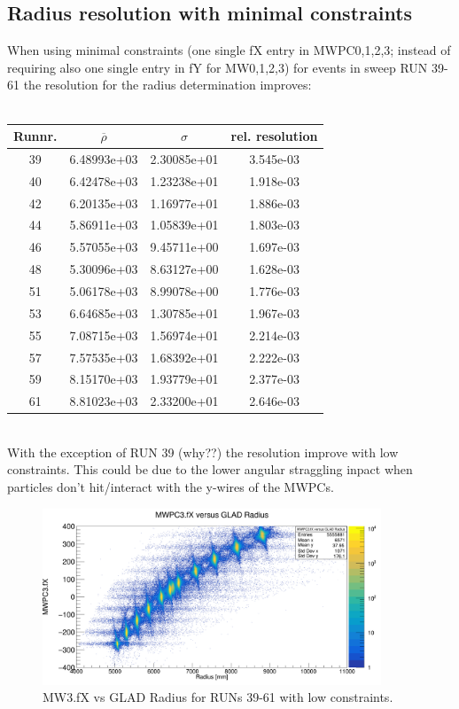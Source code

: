 \documentclass[12pt, letterpaper]{article}
\begin{document}
\begin{appendices}
\section{Radius resolution with minimal constraints}
When using minimal constraints (one single fX entry in MWPC0,1,2,3; instead of requiring also one single entry in fY for MW0,1,2,3) for events in sweep RUN 39-61 the resolution for the radius  determination improves:\\
\\
\begin{tabular}{|c|c|c|c|}
\hline
Runnr. & $\overline{\rho}$ & $\sigma$ & rel. resolution \\
\hline
39     &6.48993e+03&2.30085e+01&3.545e-03 \\
40     &6.42478e+03&1.23238e+01&1.918e-03 \\
42     &6.20135e+03&1.16977e+01&1.886e-03 \\
44     &5.86911e+03&1.05839e+01&1.803e-03 \\
46     &5.57055e+03&9.45711e+00&1.697e-03 \\
48     &5.30096e+03&8.63127e+00&1.628e-03 \\
51     &5.06178e+03&8.99078e+00&1.776e-03 \\
53     &6.64685e+03&1.30785e+01&1.967e-03 \\
55     &7.08715e+03&1.56974e+01&2.214e-03 \\
57     &7.57535e+03&1.68392e+01&2.222e-03 \\
59     &8.15170e+03&1.93779e+01&2.377e-03 \\
61     &8.81023e+03&2.33200e+01&2.646e-03 \\

\hline

\end{tabular}
\\
\newline
With the exception of RUN 39 (why??) the resolution improve with low constraints. This could be due to the lower angular straggling inpact when particles don't hit/interact with the y-wires of the MWPCs.\\
\begin{figure}[!htb]
	\centering
	\includegraphics[width=0.9\textwidth]{mw3_vs_rad_low_const.png}
	\caption{MW3.fX vs GLAD Radius for RUNs 39-61 with low constraints.}
	\label{fig:mw3_rad_low_const}
\end{figure}


\end{appendices}
\end{document}
